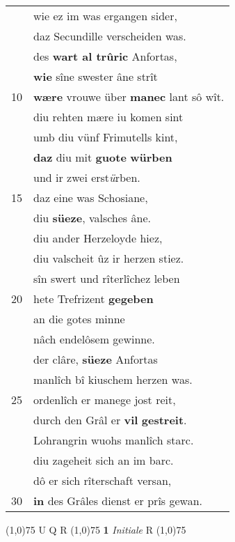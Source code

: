 \documentclass[8pt,a4paper,notitlepage]{article}
\begin{document}
\begin{table}[ht]
\begin{minipage}[t]{0.5\linewidth}
\begin{tabular}{rl}
 & wie ez im was ergangen sider,\\ 
 & daz Secundille verscheiden was.\\ 
 & des \textbf{wart al trûric} Anfortas,\\ 
 & \textbf{wie} sîne swester âne strît\\ 
10 & \textbf{wære} vrouwe über \textbf{manec} lant sô wît.\\ 
 & diu rehten mære iu komen sint\\ 
 & umb diu vünf Frimutells kint,\\ 
 & \textbf{daz} diu mit \textbf{guote} \textbf{würben}\\ 
 & und ir zwei erst\textit{ü}rben.\\ 
15 & daz eine was Schosiane,\\ 
 & diu \textbf{süeze}, valsches âne.\\ 
 & diu ander Herzeloyde hiez,\\ 
 & diu valscheit ûz ir herzen stiez.\\ 
 & sîn swert und rîterlîchez leben\\ 
20 & hete Trefrizent \textbf{gegeben}\\ 
 & an die gotes minne\\ 
 & nâch endelôsem gewinne.\\ 
 & der clâre, \textbf{süeze} Anfortas\\ 
 & manlîch bî kiuschem herzen was.\\ 
25 & ordenlîch er manege jost reit,\\ 
 & durch den Grâl er \textbf{vil} \textbf{gestreit}.\\ 
 & Lohrangrin wuohs manlîch starc.\\ 
 & diu zageheit sich an im barc.\\ 
 & dô er sich rîterschaft versan,\\ 
30 & \textbf{in} des Grâles dienst er prîs gewan.\\ 
\end{tabular}
\scriptsize
\line(1,0){75} \newline
U Q R \newline
\line(1,0){75} \newline
\textbf{1} \textit{Initiale} R  \newline
\line(1,0){75} \newline

\end{minipage}
\end{table}
\end{document}
